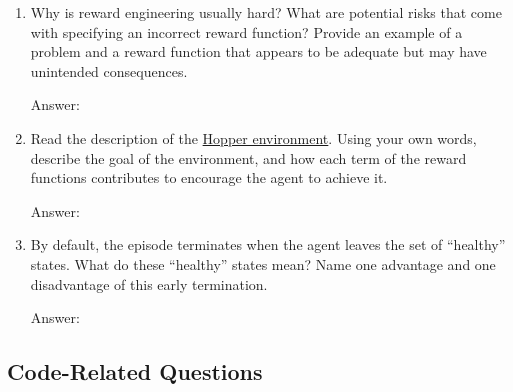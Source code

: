 \documentclass{article}
\newcommand{\answer}[1]{
    \begin{tcolorbox}[breakable]
    Answer: #1
    \end{tcolorbox}
    \clearpage
}
\begin{document}
\begin{enumerate}

    \item[(a)] Why is reward engineering usually hard? What are potential risks that come with specifying an incorrect reward function? Provide an example of a problem and a reward function that appears to be adequate but may have unintended consequences.
    \answer{
    
    }

    \item[(b)] Read the description of the \href{https://gymnasium.farama.org/environments/mujoco/hopper/}{Hopper environment}. Using your own words, describe the goal of the environment, and how each term of the reward functions contributes to encourage the agent to achieve it.
    \answer{

    }

    \item[(c)] By default, the episode terminates when the agent leaves the set of ``healthy'' states. What do these ``healthy'' states mean? Name one advantage and one disadvantage of this early termination.
    \answer{

    }

\end{enumerate}

\subsection{Code-Related Questions}
\end{document}
